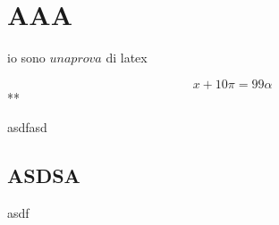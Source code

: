\section{AAA}
io sono $una prova$ di latex

$$
x+10 \pi = 99 \alpha
$$**

asdfasd
\subsection{ASDSA}
asdf
